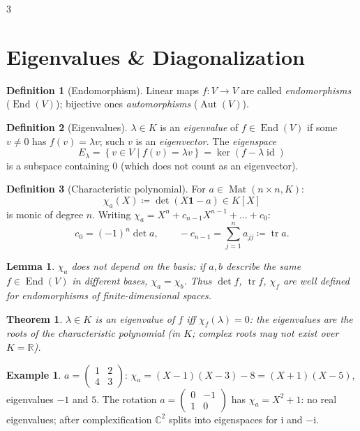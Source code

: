 \documentclass[10pt,a4paper,landscape]{article}
\theoremstyle{definition}
\newtheorem{defn}{Definition}[section]
\newtheorem{exm}{Example}[section]
\theoremstyle{plain}
\newtheorem{thm}{Theorem}[section]
\newtheorem{lem}{Lemma}[section]
\theoremstyle{remark}
\newcommand{\R}{\mathbb{R}}
\newcommand{\C}{\mathbb{C}}
\newcommand{\id}{\operatorname{id}}
\newcommand{\set}[1]{\left\{ #1 \right\}}
\newcommand{\deq}{\coloneqq}
\DeclareMathOperator{\End}{End}
\DeclareMathOperator{\Aut}{Aut}
\DeclareMathOperator{\Mat}{Mat}
\DeclareMathOperator{\tr}{tr}
\newcommand{\one}{\mathbf{1}}
\newcommand{\Char}{\chi}
\begin{document}
\begin{multicols*}{3}
\section{Eigenvalues \& Diagonalization}

\begin{defn}[Endomorphism]
Linear maps $f: V \to V$ are called \emph{endomorphisms} ($\End(V)$); bijective ones \emph{automorphisms} ($\Aut(V)$).
\end{defn}

\begin{defn}[Eigenvalues]
$\lambda \in K$ is an \emph{eigenvalue} of $f \in \End(V)$ if some $v \neq 0$ has $f(v) = \lambda v$; such $v$ is an \emph{eigenvector}. The \emph{eigenspace}
\[
E_{\lambda} = \set{v \in V \mid f(v) = \lambda v} = \ker(f - \lambda \id)
\]
is a subspace containing $0$ (which does not count as an eigenvector).
\end{defn}

\begin{defn}[Characteristic polynomial]
For $a \in \Mat(n \times n, K)$:
\[
\Char_a(X) \deq \det(X \one - a) \in K[X]
\]
is monic of degree $n$. Writing $\Char_a = X^n + c_{n-1}X^{n-1} + \dots + c_0$:
\[
c_0 = (-1)^n \det a, \qquad -c_{n-1} = \sum_{j=1}^n a_{jj} \deq \tr a .
\]
\end{defn}

\begin{lem}
$\Char_a$ does not depend on the basis: if $a, b$ describe the same $f \in \End(V)$ in different bases, $\Char_a = \Char_b$. Thus $\det f$, $\tr f$, $\Char_f$ are well defined for endomorphisms of finite-dimensional spaces.
\end{lem}

\begin{thm}
$\lambda \in K$ is an eigenvalue of $f$ iff $\Char_f(\lambda) = 0$: the eigenvalues are the roots of the characteristic polynomial (in $K$; complex roots may not exist over $K = \R$).
\end{thm}

\begin{exm}
$a = \left(\begin{smallmatrix} 1 & 2 \\ 4 & 3 \end{smallmatrix}\right)$: $\Char_a = (X-1)(X-3) - 8 = (X+1)(X-5)$, eigenvalues $-1$ and $5$. The rotation $a = \left(\begin{smallmatrix} 0 & -1 \\ 1 & 0 \end{smallmatrix}\right)$ has $\Char_a = X^2 + 1$: no real eigenvalues; after complexification $\C^2$ splits into eigenspaces for $\mathrm{i}$ and $-\mathrm{i}$.
\end{exm}


\end{multicols*}
\end{document}
